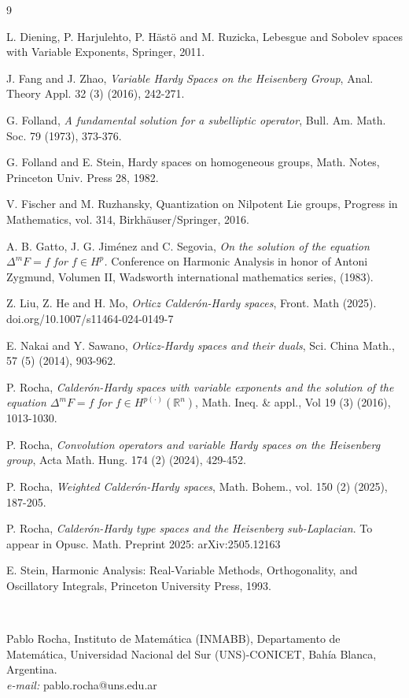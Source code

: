 \documentclass[oneside,10pt]{article}
\begin{document}
\begin{thebibliography}{9}

 {\sc L. Diening, P. Harjulehto, P. H\"ast\"o and M. Ruzicka}, Lebesgue and Sobolev spaces with Variable Exponents, Springer, 2011. 

 {\sc J. Fang and J. Zhao}, \textit{Variable Hardy Spaces on the Heisenberg Group}, Anal. Theory Appl. 32 (3) (2016), 
242-271.

 {\sc G. Folland}, \textit{A fundamental solution for a subelliptic operator}, Bull. Am. Math. Soc. 79 (1973), 373-376.

 {\sc G. Folland and E. Stein}, Hardy spaces on homogeneous groups, Math. Notes, Princeton Univ. Press 28, 1982.

 {\sc V. Fischer and M. Ruzhansky}, Quantization on Nilpotent Lie groups,  Progress in Mathematics, vol. 314, 
Birkh\"auser/Springer, 2016. 

 {\sc A. B. Gatto, J. G. Jim\'enez and C. Segovia}, \textit{On the solution of the equation $\Delta^{m}F = f$ for 
$f \in H^{p}$.} Conference on Harmonic Analysis in honor of Antoni Zygmund, Volumen II, Wadsworth international mathematics series, (1983).

 {\sc Z. Liu, Z. He and H. Mo}, \textit{Orlicz Calder\'on-Hardy spaces}, Front. Math (2025). doi.org/10.1007/s11464-024-0149-7

 {\sc E. Nakai and Y. Sawano}, \textit{Orlicz-Hardy spaces and their duals}, Sci. China Math., 57 (5) (2014), 903-962.

 {\sc P. Rocha}, \textit{Calder\'on-Hardy spaces with variable exponents and the solution of the equation $\Delta^{m}F=f$ for
$f \in H^{p(\cdot)}(\mathbb{R}^{n})$}, Math. Ineq. \& appl., Vol 19 (3) (2016), 1013-1030.

 {\sc P. Rocha}, \textit{Convolution operators and variable Hardy spaces on the Heisenberg group}, Acta Math. Hung. 174 (2) 
(2024), 429-452.

 {\sc P. Rocha}, \textit{Weighted Calder\'on-Hardy spaces}, Math. Bohem., vol. 150 (2) (2025), 187-205.


 {\sc P. Rocha}, \textit{Calder\'on-Hardy type spaces and the Heisenberg sub-Laplacian}. To appear in Opusc. Math. Preprint 2025: arXiv:2505.12163

 {\sc E. Stein}, Harmonic Analysis: Real-Variable Methods, Orthogonality, and Oscillatory Integrals, Princeton University Press, 1993.

\end{thebibliography}

\

Pablo Rocha, Instituto de Matem\'atica (INMABB), Departamento de Matem\'atica, Universidad Nacional del Sur (UNS)-CONICET, Bah\'ia Blanca, Argentina. \\
{\it e-mail:} pablo.rocha@uns.edu.ar
\end{document}
